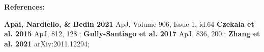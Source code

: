 \documentclass[11pt]{article}
\begin{document}
{\setlength{\parindent}{0cm}
\textbf{References:}
{\footnotesize \textbf{Apai, Nardiello, \& Bedin 2021} ApJ, Volume 906, Issue 1, id.64 \textbf{Czekala et al. 2015} ApJ, 812, 128.; \textbf{Gully-Santiago et al. 2017} ApJ, 836, 200.; \textbf{Zhang et al. 2021} arXiv:2011.12294;
\setlength{\parindent}{1cm}

\clearpage


%
%
%

\expdesign

%



%
%
%

}}
\end{document}
